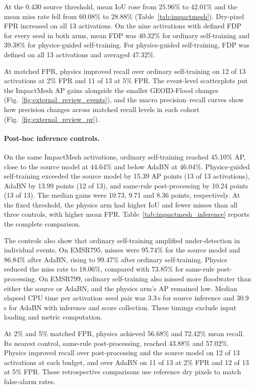 At the 0.430 source threshold, mean IoU rose from 25.96\% to 42.01\% and the mean miss rate fell from 60.08\% to 28.88\% (Table~\ref{tab:impactmesh}). Dry-pixel FPR increased on all 13 activations. On the nine activations with defined FDP for every seed in both arms, mean FDP was 40.32\% for ordinary self-training and 39.38\% for physics-guided self-training. For physics-guided self-training, FDP was defined on all 13 activations and averaged 47.32\%.

At matched FPR, physics improved recall over ordinary self-training on 12 of 13 activations at 2\% FPR and 11 of 13 at 5\% FPR. The event-level scatterplots put the ImpactMesh AP gains alongside the smaller GEOID-Flood changes (Fig.~\ref{fig:external_review_events}), and the macro precision--recall curves show how precision changes across matched recall levels in each cohort (Fig.~\ref{fig:external_review_pr}).

\paragraph{Post-hoc inference controls.} On the same ImpactMesh activations, ordinary self-training reached 45.10\% AP, close to the source model at 44.64\% and below AdaBN at 46.04\%. Physics-guided self-training exceeded the source model by 15.39 AP points (13 of 13 activations), AdaBN by 13.99 points (12 of 13), and same-rule post-processing by 10.24 points (13 of 13). The median gains were 10.73, 9.71 and 8.36 points, respectively. At the fixed threshold, the physics arm had higher IoU and fewer misses than all three controls, with higher mean FPR. Table~\ref{tab:impactmesh_inference} reports the complete comparison.

The controls also show that ordinary self-training amplified under-detection in individual events. On EMSR795, misses were 95.74\% for the source model and 86.84\% after AdaBN, rising to 99.47\% after ordinary self-training. Physics reduced the miss rate to 18.06\%, compared with 73.85\% for same-rule post-processing. On EMSR799, ordinary self-training also missed more floodwater than either the source or AdaBN, and the physics arm's AP remained low. Median elapsed CPU time per activation--seed pair was 3.3\,s for source inference and 30.9\,s for AdaBN with inference and score collection. These timings exclude input loading and metric computation.

At 2\% and 5\% matched FPR, physics achieved 56.68\% and 72.42\% mean recall. Its nearest control, same-rule post-processing, reached 43.88\% and 57.02\%. Physics improved recall over post-processing and the source model on 12 of 13 activations at each budget, and over AdaBN on 11 of 13 at 2\% FPR and 12 of 13 at 5\% FPR. These retrospective comparisons use reference dry pixels to match false-alarm rates.


